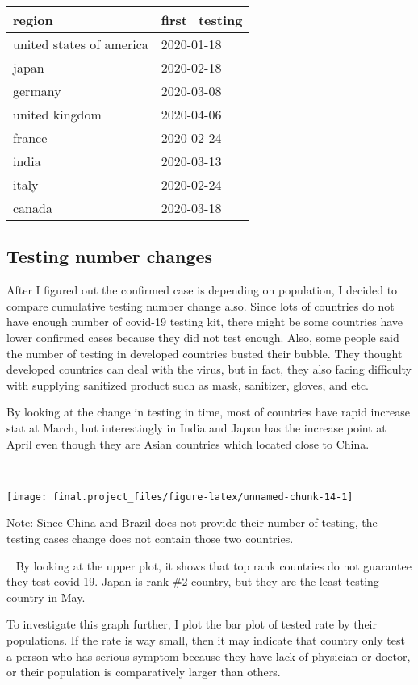 \documentclass[
  11pt,
]{article}
\begin{document}
\begin{longtable}[]{@{}ll@{}}
\toprule
region & first\_testing\tabularnewline
\midrule
\endhead
united states of america & 2020-01-18\tabularnewline
japan & 2020-02-18\tabularnewline
germany & 2020-03-08\tabularnewline
united kingdom & 2020-04-06\tabularnewline
france & 2020-02-24\tabularnewline
india & 2020-03-13\tabularnewline
italy & 2020-02-24\tabularnewline
canada & 2020-03-18\tabularnewline
\bottomrule
\end{longtable}

\hypertarget{testing-number-changes}{%
\subsection{Testing number changes}\label{testing-number-changes}}

After I figured out the confirmed case is depending on population, I
decided to compare cumulative testing number change also. Since lots of
countries do not have enough number of covid-19 testing kit, there might
be some countries have lower confirmed cases because they did not test
enough. Also, some people said the number of testing in developed
countries busted their bubble. They thought developed countries can deal
with the virus, but in fact, they also facing difficulty with supplying
sanitized product such as mask, sanitizer, gloves, and etc.

By looking at the change in testing in time, most of countries have
rapid increase stat at March, but interestingly in India and Japan has
the increase point at April even though they are Asian countries which
located close to China.

~

\begin{center}\texttt{[image: final.project\_files/figure-latex/unnamed-chunk-14-1]} \end{center}

Note: Since China and Brazil does not provide their number of testing,
the testing cases change does not contain those two countries.

~ By looking at the upper plot, it shows that top rank countries do not
guarantee they test covid-19. Japan is rank \#2 country, but they are
the least testing country in May.

To investigate this graph further, I plot the bar plot of tested rate by
their populations. If the rate is way small, then it may indicate that
country only test a person who has serious symptom because they have
lack of physician or doctor, or their population is comparatively larger
than others.
\end{document}
